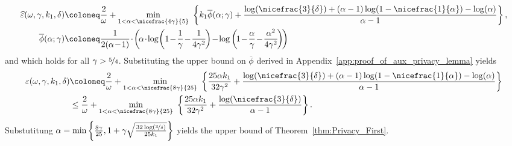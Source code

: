 \documentclass[11pt]{article}
\theoremstyle{definition}
\theoremstyle{plain}
\providecommand{\theoremref}[1]{Theorem~\ref{#1}}
\providecommand{\appendixref}[1]{Appendix~\ref{#1}}
\newcommand{\eps}{{\varepsilon}}
\renewcommand{\eps}{\varepsilon}
\begin{document}
\begin{align}
    \widehat{\eps}(\omega, \gamma, k_1, \delta) &\coloneq \frac{2}{\omega} + \underset{1 < \alpha < \nicefrac{4\gamma}{5}}{\min} \ \left\{k_1 \overline{\phi}(\alpha; \gamma) + \frac{\log(\nicefrac{3}{\delta}) + (\alpha - 1)\log(1 - \nicefrac{1}{\alpha}) - \log(\alpha)}{\alpha - 1}\right\}, \\ 
    \overline{\phi}(\alpha; \gamma) &\coloneq \frac{1}{2(\alpha \hspace{-0.15em}-\hspace{-0.15em} 1)}\hspace{-0.15em}\cdot\hspace{-0.15em} \left(\hspace{-0.15em}\alpha\hspace{-0.15em}\cdot\hspace{-0.15em} \log\hspace{-0.15em}\left(1 \hspace{-0.15em}-\hspace{-0.15em} \frac{1}{\gamma} \hspace{-0.15em}-\hspace{-0.15em} \frac{1}{4\gamma^2}\hspace{-0.15em}\right) \hspace{-0.15em}-\hspace{-0.15em} \log\left(\hspace{-0.15em}1 \hspace{-0.15em}-\hspace{-0.15em} \frac{\alpha}{\gamma} \hspace{-0.15em}-\hspace{-0.15em} \frac{\alpha^2}{4\gamma^2}\hspace{-0.15em}\right)\hspace{-0.15em}\right)
\end{align}
and which holds for all $\gamma > \nicefrac{5}{4}$. Substituting the upper bound on $\overline{\phi}$ derived in \appendixref{app:proof_of_aux_privacy_lemma} yields 
\begin{align}
    \eps(\omega, \gamma, k_1, \delta) &\coloneq \frac{2}{\omega} + \underset{1 < \alpha < \nicefrac{8\gamma}{25}}{\min} \ \left\{\frac{25\alpha k_1}{32\gamma^2} + \frac{\log(\nicefrac{3}{\delta}) + (\alpha - 1)\log(1 - \nicefrac{1}{\alpha}) - \log(\alpha)}{\alpha - 1}\right\}\\
    &\leq \frac{2}{\omega} + \underset{1 < \alpha < \nicefrac{8\gamma}{25}}{\min} \ \left\{\frac{25\alpha k_1}{32\gamma^2} + \frac{\log(\nicefrac{3}{\delta})}{\alpha - 1}\right\}.
\end{align}
Substutitung $\alpha = \min\left\{\frac{8\gamma}{25}, 1 + \gamma\sqrt{\frac{32\log(\nicefrac{3}{\delta})}{25k_1}}\right\}$ yields the upper bound of \theoremref{thm:Privacy_First}. 
\end{document}
